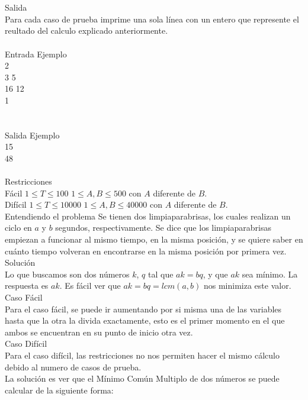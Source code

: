 \documentclass[12pt]{article}
\begin{document}
\\
\\
\textrm{\large Salida}
\\
Para cada caso de prueba imprime una sola línea con un entero que represente el reultado del calculo explicado anteriormente.
\\
\\
\textrm{\large Entrada Ejemplo}
\\
2\\
3 5\\
16 12\\
1\\
\\
\\
\textrm{\large Salida Ejemplo}
\\
15\\
48\\
\\Restricciones
\\Fácil
$1 ≤ T ≤ 100$
$1 ≤ A, B ≤ 500$ con $A$ diferente de $B$.
\\Difícil
$1 ≤ T ≤ 10000$
$1 ≤ A, B ≤ 40000$ con $A$ diferente de $B$.\\
\textrm{\large Entendiendo el problema}
Se tienen dos limpiaparabrisas, los cuales realizan un ciclo en $a$ y $b$ segundos, respectivamente. Se dice que los limpiaparabrisas empiezan a funcionar al mismo tiempo, en la misma posición, y se quiere saber en cuánto tiempo volveran en encontrarse en la misma posición por primera vez.\\

\textrm{\large Solución}\\

Lo que buscamos son dos números $k$, $q$ tal que $ak = bq$, y que $ak$ sea mínimo. La respuesta es $ak$. Es fácil ver que $ak = bq = lcm(a, b)$ nos minimiza este valor.\\

\textrm{\large Caso Fácil}\\
Para el caso fácil, se puede ir aumentando por si misma una de las variables hasta que la otra la divida exactamente, esto es el primer momento en el que ambos se encuentran en su punto de inicio otra vez.\\

\textrm{\large Caso Difícil}\\
Para el caso difícil, las restricciones no nos permiten hacer el mismo cálculo debido al numero de casos de prueba.\\

La solución es ver que el Mínimo Común Multiplo de dos números se puede calcular de la siguiente forma:
\end{document}
